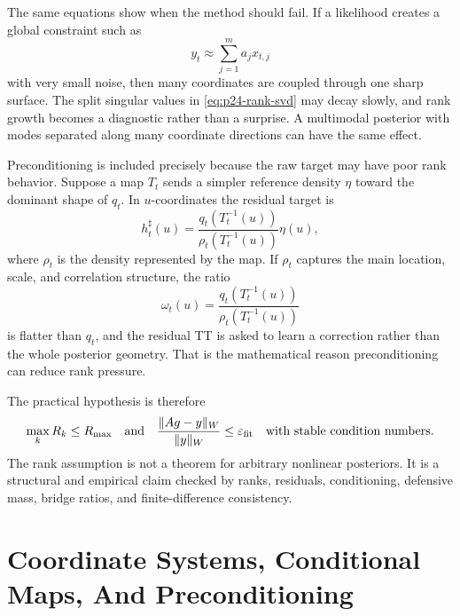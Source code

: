 \documentclass[11pt]{article}
\numberwithin{equation}{section}
\begin{document}
The same equations show when the method should fail.  If a likelihood creates
a global constraint such as
\begin{equation}
    y_t\approx \sum_{j=1}^m a_j x_{t,j}
    \label{eq:p24-rank-global-constraint}
\end{equation}
with very small noise, then many coordinates are coupled through one sharp
surface.  The split singular values in \eqref{eq:p24-rank-svd} may decay
slowly, and rank growth becomes a diagnostic rather than a surprise.  A
multimodal posterior with modes separated along many coordinate directions can
have the same effect.

Preconditioning is included precisely because the raw target may have poor
rank behavior.  Suppose a map \(T_t\) sends a simpler reference density
\(\eta\) toward the dominant shape of \(q_t\).  In \(u\)-coordinates the
residual target is
\begin{equation}
    h^\sharp_t(u)
    =
    \frac{q_t(T_t^{-1}(u))}
         {\rho_t(T_t^{-1}(u))}
    \eta(u),
    \label{eq:p24-rank-residual}
\end{equation}
where \(\rho_t\) is the density represented by the map.  If \(\rho_t\) captures
the main location, scale, and correlation structure, the ratio
\begin{equation}
    \omega_t(u)
    =
    \frac{q_t(T_t^{-1}(u))}
         {\rho_t(T_t^{-1}(u))}
    \label{eq:p24-rank-residual-ratio}
\end{equation}
is flatter than \(q_t\), and the residual TT is asked to learn a correction
rather than the whole posterior geometry.  That is the mathematical reason
preconditioning can reduce rank pressure.

The practical hypothesis is therefore
\begin{equation}
    \max_k R_k \le R_{\max}
    \quad\text{and}\quad
    \frac{\|A g-y\|_{W}}{\|y\|_{W}}\le\varepsilon_{\rm fit}
    \quad\text{with stable condition numbers}.
    \label{eq:p24-rank-diagnostic}
\end{equation}
The rank assumption is not a theorem for arbitrary nonlinear posteriors.  It
is a structural and empirical claim checked by ranks, residuals, conditioning,
defensive mass, bridge ratios, and finite-difference consistency.

\section{Coordinate Systems, Conditional Maps, And Preconditioning}
\end{document}
